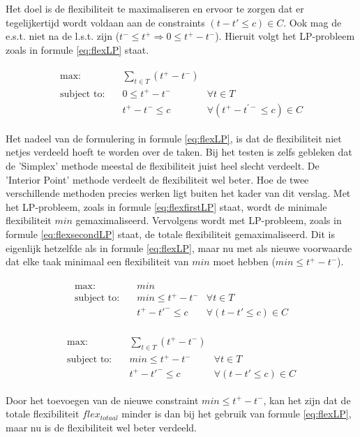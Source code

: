 Het doel is de flexibiliteit te maximaliseren en ervoor te zorgen dat er tegelijkertijd wordt voldaan aan de constraints $(t - t' \leq c) \in C$. Ook mag de e.s.t. niet na de l.s.t. zijn ($t^- \leq t^+ \Rightarrow 0 \leq t^+ - t^-$). Hieruit volgt het LP-probleem zoals in formule \ref{eq:flexLP} staat.

\begin{align}
\label{eq:flexLP}
\begin{aligned}
        \text{max:}& \quad \sum_{t \in T} (t^+ - t^-) & \\
 \text{subject to:}& \quad 0 \leq t^+ - t^- & \forall t \in T \\
                   & \quad t^+ - t^- \leq c & \forall (t^+ - t^{'-} \leq c) \in C
\end{aligned}
\end{align}

Het nadeel van de formulering in formule \ref{eq:flexLP}, is dat de flexibiliteit niet netjes verdeeld hoeft te worden over de taken. Bij het testen is zelfs gebleken dat de 'Simplex' methode meestal de flexibiliteit juist heel slecht verdeelt. De 'Interior Point' methode verdeelt de flexibiliteit wel beter. Hoe de twee verschillende methoden precies werken ligt buiten het kader van dit verslag. Met het LP-probleem, zoals in formule \ref{eq:flexfirstLP} staat, wordt de minimale flexibiliteit $min$ gemaximaliseerd. Vervolgens wordt met LP-probleem, zoals in formule \ref{eq:flexsecondLP} staat, de totale flexibiliteit gemaximaliseerd. Dit is eigenlijk hetzelfde als in formule \ref{eq:flexLP}, maar nu met als nieuwe voorwaarde dat elke taak minimaal een flexibiliteit van $min$ moet hebben ($min \leq t^+ - t^ -$). 

\begin{align}
\label{eq:flexfirstLP}
\begin{aligned}
        \text{max:}& \quad min & \\
 \text{subject to:}& \quad min \leq t^+ - t^- & \forall t \in T \\
                   & \quad t^+ - t'^- \leq c & \forall (t - t' \leq c) \in C
\end{aligned}
\end{align}

\begin{align}
\label{eq:flexsecondLP}
\begin{aligned}
        \text{max:}& \quad \sum_{t \in T} (t^+ - t^-) & \\
 \text{subject to:}& \quad min \leq t^+ - t^- & \forall t \in T \\
                   & \quad t^+ - t'^- \leq c & \forall (t - t' \leq c) \in C
\end{aligned}
\end{align}

Door het toevoegen van de nieuwe constraint $min \leq t^+ - t^-$, kan het zijn dat de totale flexibiliteit $flex_{totaal}$ minder is dan bij het gebruik van formule \ref{eq:flexLP}, maar nu is de flexibiliteit wel beter verdeeld.
